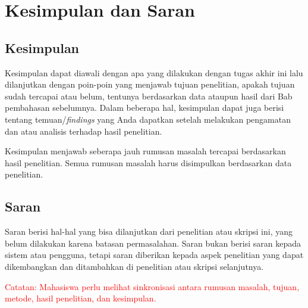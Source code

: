 \chapter{Kesimpulan dan Saran}

\section{Kesimpulan}

Kesimpulan dapat diawali dengan apa yang dilakukan dengan tugas akhir ini lalu 
dilanjutkan dengan poin-poin yang menjawab tujuan penelitian, apakah tujuan sudah tercapai atau belum, tentunya berdasarkan data ataupun hasil dari Bab pembahasan sebelumnya. Dalam beberapa hal, kesimpulan dapat juga berisi tentang temuan/\textit{findings} yang Anda dapatkan setelah melakukan pengamatan dan atau analisis terhadap hasil penelitian. 

Kesimpulan menjawab seberapa jauh rumusan masalah tercapai berdasarkan hasil penelitian. Semua rumusan masalah harus disimpulkan berdasarkan data penelitian.

\section{Saran}

Saran berisi hal-hal yang bisa dilanjutkan dari penelitian atau skripsi ini, yang belum dilakukan karena batasan permasalahan. Saran bukan berisi saran kepada sistem atau pengguna, tetapi saran diberikan kepada aspek penelitian yang dapat dikembangkan dan ditambahkan di penelitian atau skripsi selanjutnya.


\noindent \textcolor{red}{Catatan: Mahasiswa perlu melihat sinkronisasi antara rumusan masalah, tujuan, metode, hasil penelitian, dan kesimpulan.}
